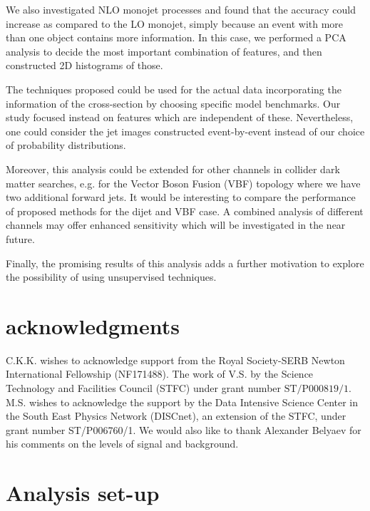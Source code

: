 \documentclass[prd,aps,letterpaper,floatfix,superscriptaddress,preprintnumbers,twocolumn,10pt,nofootinbib]{revtex4-1}
\begin{document}
We also investigated NLO monojet processes and found that the accuracy could increase as compared to the LO monojet, simply because an event with more than one object contains more information. In this case, we performed a PCA analysis to decide the most important combination of features, and then constructed 2D histograms of those.

The techniques proposed could be used for the actual data incorporating the information of the cross-section by choosing specific model benchmarks.  Our study focused instead on features which are independent of these. Nevertheless, one could consider the jet images constructed event-by-event instead of our choice of probability distributions. 

Moreover, this analysis could be extended for other channels in collider dark matter searches, e.g. for the Vector Boson Fusion (VBF) topology where we have two additional forward jets. It would be interesting to compare the performance of proposed methods for the dijet and VBF case. A combined analysis of different channels may offer enhanced sensitivity which will be investigated in the near future. 

Finally, the promising results of this analysis adds a further motivation to explore the possibility of using unsupervised techniques.

\section{acknowledgments}
C.K.K. wishes to acknowledge support from the Royal Society-SERB Newton International Fellowship (NF171488). 
The work of V.S. by the Science Technology and Facilities Council (STFC) under grant number $\text{ST/P000819/1}$. M.S. wishes to acknowledge the support by the Data Intensive Science Center in the South East Physics Network (DISCnet), an extension of the STFC, under grant number ST/P006760/1. We would also like to thank Alexander Belyaev for his comments on the levels of signal and background.

\appendix
\newcommand{\hbAppendixPrefix}{A}
%
\renewcommand{\thefigure}{\hbAppendixPrefix\arabic{figure}}
\setcounter{figure}{0}

\setcounter{table}{0}
\renewcommand{\thetable}{B\arabic{table}}
\section{Analysis set-up\label{setup}}
\end{document}
